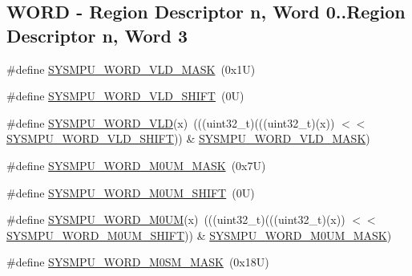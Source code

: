 \subsection*{W\+O\+RD -\/ Region Descriptor n, Word 0..Region Descriptor n, Word 3}
\begin{DoxyCompactItemize}
\item 
\#define \mbox{\hyperlink{group___s_y_s_m_p_u___register___masks_ga65e6de8c34911946e2548317ef7f5aa0}{S\+Y\+S\+M\+P\+U\+\_\+\+W\+O\+R\+D\+\_\+\+V\+L\+D\+\_\+\+M\+A\+SK}}~(0x1\+U)
\item 
\#define \mbox{\hyperlink{group___s_y_s_m_p_u___register___masks_ga3a8af1d96f0672f6e086d70f9bcbb06a}{S\+Y\+S\+M\+P\+U\+\_\+\+W\+O\+R\+D\+\_\+\+V\+L\+D\+\_\+\+S\+H\+I\+FT}}~(0\+U)
\item 
\#define \mbox{\hyperlink{group___s_y_s_m_p_u___register___masks_ga12198f84250021efbcc5cd113b082a46}{S\+Y\+S\+M\+P\+U\+\_\+\+W\+O\+R\+D\+\_\+\+V\+LD}}(x)~(((uint32\+\_\+t)(((uint32\+\_\+t)(x)) $<$$<$ \mbox{\hyperlink{group___s_y_s_m_p_u___register___masks_ga3a8af1d96f0672f6e086d70f9bcbb06a}{S\+Y\+S\+M\+P\+U\+\_\+\+W\+O\+R\+D\+\_\+\+V\+L\+D\+\_\+\+S\+H\+I\+FT}})) \& \mbox{\hyperlink{group___s_y_s_m_p_u___register___masks_ga65e6de8c34911946e2548317ef7f5aa0}{S\+Y\+S\+M\+P\+U\+\_\+\+W\+O\+R\+D\+\_\+\+V\+L\+D\+\_\+\+M\+A\+SK}})
\item 
\#define \mbox{\hyperlink{group___s_y_s_m_p_u___register___masks_ga8a0fececd20e71c06897b79aa2b03eb4}{S\+Y\+S\+M\+P\+U\+\_\+\+W\+O\+R\+D\+\_\+\+M0\+U\+M\+\_\+\+M\+A\+SK}}~(0x7\+U)
\item 
\#define \mbox{\hyperlink{group___s_y_s_m_p_u___register___masks_gaf863864153f045db758c616b3a798ecc}{S\+Y\+S\+M\+P\+U\+\_\+\+W\+O\+R\+D\+\_\+\+M0\+U\+M\+\_\+\+S\+H\+I\+FT}}~(0\+U)
\item 
\#define \mbox{\hyperlink{group___s_y_s_m_p_u___register___masks_ga0fbbafb44245a49e27cb15d1bd6b5ff5}{S\+Y\+S\+M\+P\+U\+\_\+\+W\+O\+R\+D\+\_\+\+M0\+UM}}(x)~(((uint32\+\_\+t)(((uint32\+\_\+t)(x)) $<$$<$ \mbox{\hyperlink{group___s_y_s_m_p_u___register___masks_gaf863864153f045db758c616b3a798ecc}{S\+Y\+S\+M\+P\+U\+\_\+\+W\+O\+R\+D\+\_\+\+M0\+U\+M\+\_\+\+S\+H\+I\+FT}})) \& \mbox{\hyperlink{group___s_y_s_m_p_u___register___masks_ga8a0fececd20e71c06897b79aa2b03eb4}{S\+Y\+S\+M\+P\+U\+\_\+\+W\+O\+R\+D\+\_\+\+M0\+U\+M\+\_\+\+M\+A\+SK}})
\item 
\#define \mbox{\hyperlink{group___s_y_s_m_p_u___register___masks_gaa2b6a90954e96cd27843e4977cadecb8}{S\+Y\+S\+M\+P\+U\+\_\+\+W\+O\+R\+D\+\_\+\+M0\+S\+M\+\_\+\+M\+A\+SK}}~(0x18\+U)
\item 

\end{DoxyCompactItemize}
